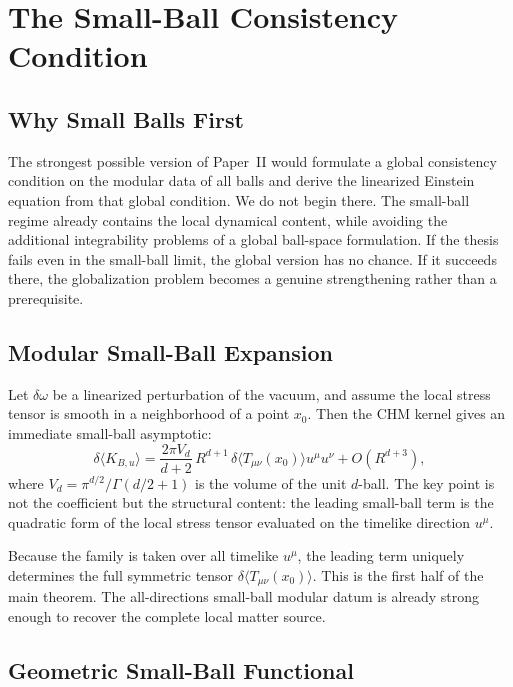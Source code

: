 \documentclass[12pt]{article}
\theoremstyle{definition}
\theoremstyle{remark}
\begin{document}
\section{The Small-Ball Consistency Condition}\label{sec:3}

\subsection{Why Small Balls First}\label{subsec:3.1}

The strongest possible version of Paper~II would formulate a global consistency condition on the modular data of all balls and derive the linearized Einstein equation from that global condition. We do not begin there. The small-ball regime already contains the local dynamical content, while avoiding the additional integrability problems of a global ball-space formulation. If the thesis fails even in the small-ball limit, the global version has no chance. If it succeeds there, the globalization problem becomes a genuine strengthening rather than a prerequisite.

\subsection{Modular Small-Ball Expansion}\label{subsec:3.2}

Let \(\delta\omega\) be a linearized perturbation of the vacuum, and assume the local stress tensor is smooth in a neighborhood of a point \(x_0\). Then the CHM kernel gives an immediate small-ball asymptotic:
\[
\delta\langle K_{B,u}\rangle
=
\frac{2\pi V_d}{d+2}\,
R^{d+1}\,
\delta\langle T_{\mu\nu}(x_0)\rangle u^\mu u^\nu
+
O(R^{d+3}),
\]
where \(V_d = \pi^{d/2}/\Gamma(d/2+1)\) is the volume of the unit \(d\)-ball. The key point is not the coefficient but the structural content: the leading small-ball term is the quadratic form of the local stress tensor evaluated on the timelike direction \(u^\mu\).

Because the family is taken over all timelike \(u^\mu\), the leading term uniquely determines the full symmetric tensor \(\delta\langle T_{\mu\nu}(x_0)\rangle\). This is the first half of the main theorem. The all-directions small-ball modular datum is already strong enough to recover the complete local matter source.

\subsection{Geometric Small-Ball Functional}\label{subsec:3.3}
\end{document}
